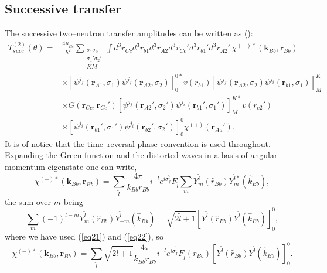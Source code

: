 \subsection{Successive transfer}
The successive two--neutron transfer amplitudes can be written as (\cite{Bayman:82}):
\begin{equation}\label{eq1}
 \begin{split}
T_{succ}^{(2)}(\theta)=&\frac{4\mu_{Cc}}{\hbar^2}\sum_{\substack{\sigma_1 \sigma_2 \\ \sigma_1' \sigma_2' \\ KM}}\int d^3r_{Cc}d^3r_{b1}d^3r_{A2}d^3r_{Cc}'
d^3r_{b1}'d^3r_{A2}' \,\chi^{(-)*}(\mathbf{k}_{Bb},\mathbf{r}_{Bb})\\
 & \times \left[ \psi ^{j_f} (\mathbf{r}_{A1},\sigma_1) \psi ^{j_f} (\mathbf{r}_{A2},\sigma_2) \right] _0^{0*} v(r_{b1})
\left[ \psi ^{j_f} (\mathbf{r}_{A2},\sigma_2) \psi ^{j_i} (\mathbf{r}_{b1},\sigma_1) \right] _M^{K}\\
& \times G(\mathbf{r}_{Cc},\mathbf{r}_{Cc}')
\left[ \psi ^{j_f} (\mathbf{r}_{A2}',\sigma_2') \psi ^{j_i} (\mathbf{r}_{b1}',\sigma_1') \right] _M^{K*} v(r_{c2}')\\
& \times \left[ \psi ^{j_i} (\mathbf{r}_{b1}',\sigma_1') \psi ^{j_i} (\mathbf{r}_{b2}',\sigma_2') \right] _0^{0}
\chi^{(+)}( \mathbf{r}_{Aa}').
 \end{split}
\end{equation}
It is of notice that the time--reversal phase convention is used throughout.
Expanding the Green function and the distorted waves in a basis of angular momentum eigenstate one can write,
\begin{equation}\label{eq2}
\chi^{(-)*}(\mathbf{k}_{Bb},\mathbf{r}_{Bb})= \sum_{\tilde l}\frac{ 4\pi }{k_{Bb} r_{Bb}} i^{-\tilde l}
e^{i\sigma_f^{\tilde l}} F_{\tilde l} \sum_m Y_m^{\tilde l} (\hat r_{Bb}) Y_m^{\tilde l*} (\hat k_{Bb}),
\end{equation}
the sum over $m$ being
\begin{equation}\label{eq3}
\sum_m (-1)^{\tilde l-m} Y_m^{\tilde l} (\hat r_{Bb}) Y_{-m}^{\tilde l}(\hat k_{Bb})=\sqrt{2\tilde l+1}
\left[  Y^{\tilde l} (\hat r_{Bb}) Y^{\tilde l} (\hat k_{Bb})\right]_0^0,
\end{equation}
where we have used (\ref{eq21}) and (\ref{eq22}), so
\begin{equation}\label{eq5}
\chi^{(-)*}(\mathbf{k}_{Bb},\mathbf{r}_{Bb})=  \sum_{\tilde l}\sqrt{2\tilde l+1}\frac{ 4\pi }{k_{Bb} r_{Bb}} i^{-\tilde l}
e^{i\sigma_f^{\tilde l}} F_{\tilde l}  (r_{Bb})
\left[  Y^{\tilde l} (\hat r_{Bb}) Y^{\tilde l} (\hat k_{Bb})\right]_0^0.
\end{equation}
